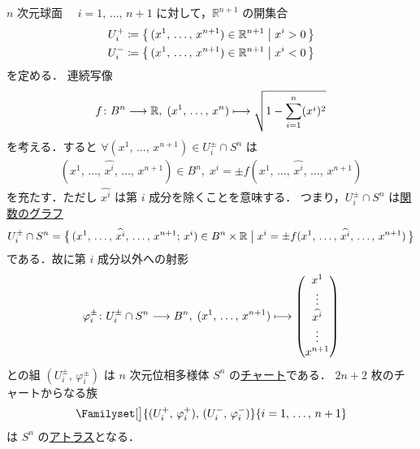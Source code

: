 \documentclass[geometry_main]{subfiles}
\begin{document}
\begin{myexample}[label=ex:topomani-n-sphere]{$n$ 次元球面}
	　$i = 1,\, \dots,\, n+1$ に対して，$\mathbb{R}^{n+1}$ の開集合
	\begin{align}
		U_i^+ &\coloneqq \bigl\{\, (x^1,\, \dots,\, x^{n+1}) \in \mathbb{R}^{n+1} \bigm| x^i > 0 \,\bigr\} \\
		U_i^- &\coloneqq \bigl\{\, (x^1,\, \dots,\, x^{n+1}) \in \mathbb{R}^{n+1} \bigm| x^i < 0 \,\bigr\} 
	\end{align}
	を定める．
	連続写像
	\begin{align}
		f \colon B^n \longrightarrow \mathbb{R},\; (x^1,\, \dots,\, x^n) \longmapsto \sqrt{1-\sum_{i=1}^n (x^i)^2}
	\end{align}
	を考える．すると $\forall (x^1,\, \dots,\, x^{n+1}) \in U_i^{\pm} \cap S^n$ は
	\begin{align}
		(x^1,\, \dots,\, \widehat{x^i},\, \dots,\, x^{n+1}) \in B^n,\; x^i = \pm f(x^1,\, \dots,\, \widehat{x^i},\, \dots,\, x^{n+1})
	\end{align}
	を充たす．ただし $\widehat{x^i}$ は第 $i$ 成分を除くことを意味する．
	つまり，$U_i^{\pm} \cap S^n$ は\hyperref[ex:graph-of-function]{関数のグラフ}
	\begin{align}
		U_i^{\pm} \cap S^n = \bigl\{\, (x^1,\, \dots,\, \widehat{x^i},\, \dots,\, x^{n+1};\, x^i) \in B^n \times \mathbb{R} \bigm| x^i = \pm f(x^1,\, \dots,\, \widehat{x^i},\, \dots,\, x^{n+1})\,\bigr\} 
	\end{align}
	である．故に第 $i$ 成分以外への射影
	\begin{align}
		\varphi_i^{\pm} \colon U_i^{\pm} \cap S^n \lto B^n,\; (x^1,\, \dots,\, x^{n+1}) \lmto \mqty(x^1 \\ \vdots \\ \widehat{x^i} \\ \vdots \\ x^{n+1})
	\end{align}
	との組 $(U^{\pm}_i,\, \varphi^{\pm}_i)$ は $n$ 次元位相多様体 $S^n$ の\hyperref[def.localcoord]{チャート}である．
	$2n+2$ 枚のチャートからなる族
	\begin{align}
		\Familyset[\big]{(U_i^+,\, \varphi_i^+),\, (U_i^-,\, \varphi_i^-)}{i=1,\, \dots,\, n+1}
	\end{align}
	は $S^n$ の\hyperref[def.atlas]{アトラス}となる．
\end{myexample}
\end{document}
